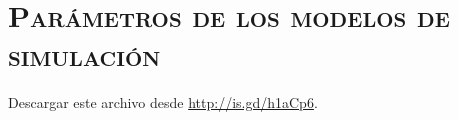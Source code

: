 \chapter{\textsc{Parámetros de los modelos de simulación}}\label{chap:cmosmodel}
\noindent Descargar este archivo desde \url{http://is.gd/h1aCp6}.

